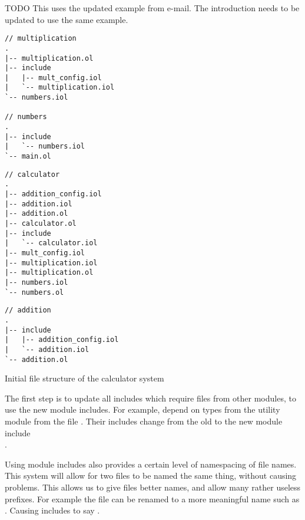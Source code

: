 TODO This uses the updated example from e-mail. The introduction needs to be
updated to use the same example.

\begin{listing}[H]

\begin{multicols}{3}

\begin{verbatim}
// multiplication
.
|-- multiplication.ol
|-- include
|   |-- mult_config.iol
|   `-- multiplication.iol
`-- numbers.iol

// numbers
.
|-- include
|   `-- numbers.iol
`-- main.ol
\end{verbatim}

\columnbreak

\begin{verbatim}
// calculator
.
|-- addition_config.iol
|-- addition.iol
|-- addition.ol
|-- calculator.ol
|-- include
|   `-- calculator.iol
|-- mult_config.iol
|-- multiplication.iol
|-- multiplication.ol
|-- numbers.iol
`-- numbers.ol
\end{verbatim}

\columnbreak

\begin{verbatim}
// addition
.
|-- include
|   |-- addition_config.iol
|   `-- addition.iol
`-- addition.ol
\end{verbatim}

\end{multicols}

\caption{Initial file structure of the calculator system}
\label{lst:start_file_structure}
\end{listing}

The first step is to update all includes which require files from other
modules, to use the new module includes. For example, 
depend on types from the utility module  from the file
. Their includes change from the old  to the new module include \\.

Using module includes also provides a certain level of namespacing of file
names. This system will allow for two files to be named the same thing, without
causing problems. This allows us to give files better names, and allow many
rather useless prefixes. For example the file  can be
renamed to a more meaningful name such as . Causing includes to
say .

